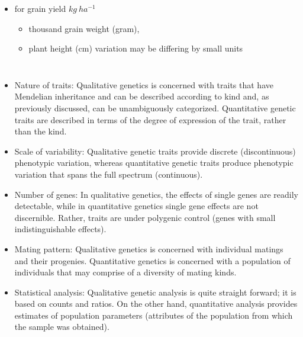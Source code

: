 \documentclass[11pt,ignorenonframetext,aspectratio=169]{beamer}
\providecommand{\tightlist}{%
  \setlength{\itemsep}{0pt}\setlength{\parskip}{0pt}}
\begin{document}
\begin{frame}{}
\begin{itemize}
  \begin{itemize}
  \tightlist
  \item
    for grain yield \(kg~ha^{-1}\)

    \begin{itemize}
    \tightlist
    \item
      thousand grain weight (gram),
    \item
      plant height (cm) variation may be differing by small units
    \end{itemize}
  \end{itemize}
\end{itemize}
\end{frame}

\begin{frame}{}
\protect\hypertarget{section-1}{}
\begin{columns}[T]
\begin{itemize}
\footnotesize
\item Nature of traits: Qualitative genetics is concerned with traits that have Mendelian inheritance and can be described according to kind and, as previously discussed, can be unambiguously categorized. Quantitative genetic traits are described in terms of the degree of expression of the trait, rather than the kind.
\item Scale of variability: Qualitative genetic traits provide discrete (discontinuous) phenotypic variation, whereas quantitative genetic traits produce phenotypic variation that spans the full spectrum (continuous).
\item Number of genes: In qualitative genetics, the effects of single genes are readily detectable, while in quantitative genetics single gene effects are not discernible. Rather, traits are under polygenic control (genes with small indistinguishable effects).
\item Mating pattern: Qualitative genetics is concerned with individual matings and their progenies. Quantitative genetics is concerned with a population of individuals that may comprise of a diversity of mating kinds.
\item Statistical analysis: Qualitative genetic analysis is quite straight forward; it is based on counts and ratios. On the other hand, quantitative analysis provides estimates of population parameters (attributes of the population from which the sample was obtained).
\end{itemize}



\end{columns}
\end{frame}
\end{document}
